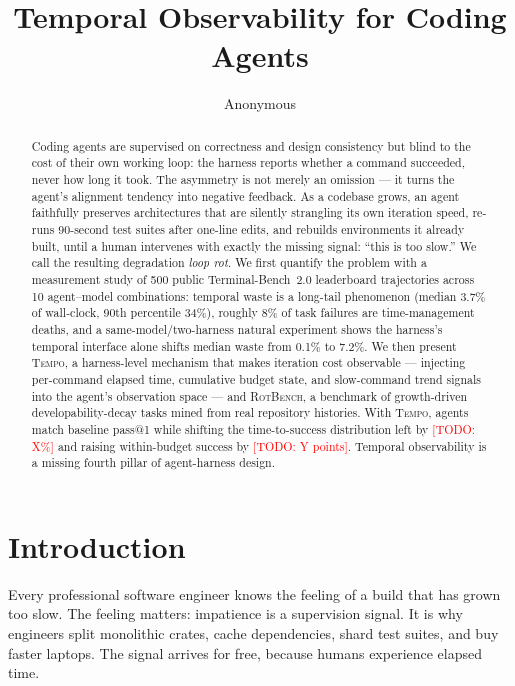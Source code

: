 \documentclass[10pt]{article}
\title{Temporal Observability for Coding Agents}
\author{Anonymous}
\date{}
\newcommand{\todo}[1]{\textcolor{red}{[TODO: #1]}}
\newcommand{\tempo}{\textsc{Tempo}}
\begin{document}
\maketitle

\begin{abstract}
Coding agents are supervised on correctness and design consistency but blind
to the cost of their own working loop: the harness reports whether a command
succeeded, never how long it took. The asymmetry is not merely an omission ---
it turns the agent's alignment tendency into negative feedback. As a codebase
grows, an agent faithfully preserves architectures that are silently
strangling its own iteration speed, re-runs 90-second test suites after
one-line edits, and rebuilds environments it already built, until a human
intervenes with exactly the missing signal: ``this is too slow.'' We call the
resulting degradation \emph{loop rot}. We first quantify the problem with a measurement
study of 500 public Terminal-Bench~2.0 leaderboard trajectories across 10
agent--model combinations: temporal waste is a long-tail phenomenon (median
3.7\% of wall-clock, 90th percentile 34\%), roughly 8\% of task failures are
time-management deaths, and a same-model/two-harness natural experiment shows
the harness's temporal interface alone shifts median waste from 0.1\% to 7.2\%.
We then present \tempo{}, a harness-level mechanism that makes iteration cost
observable --- injecting per-command elapsed time, cumulative budget state, and
slow-command trend signals into the agent's observation space --- and
\textsc{RotBench}, a benchmark of growth-driven developability-decay tasks
mined from real repository histories. With \tempo{}, agents match baseline
pass@1 while shifting the time-to-success distribution left by \todo{X\%} and
raising within-budget success by \todo{Y points}. Temporal observability is a
missing fourth pillar of agent-harness design.
\end{abstract}

\section{Introduction}

Every professional software engineer knows the feeling of a build that has
grown too slow. The feeling matters: impatience is a supervision signal. It is
why engineers split monolithic crates, cache dependencies, shard test suites,
and buy faster laptops. The signal arrives for free, because humans experience
elapsed time.
\end{document}
